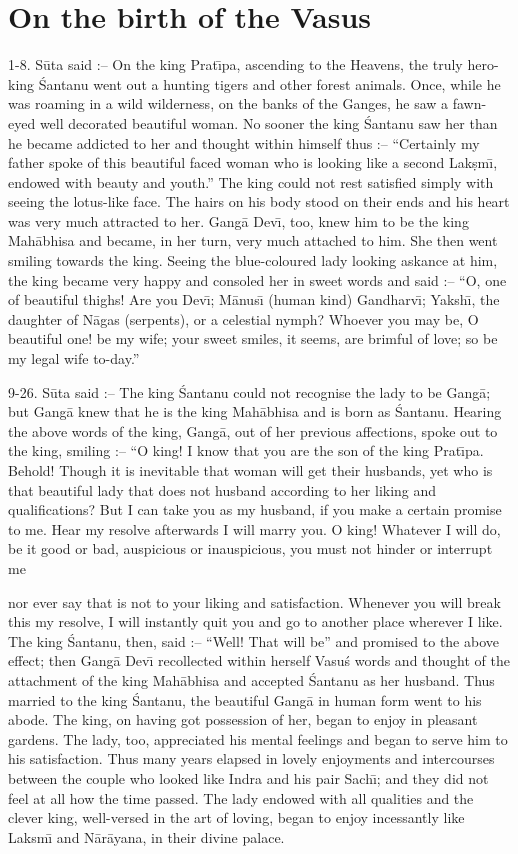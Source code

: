\chapter{On the birth of the Vasus}

1-8. S\=uta said :-- On the king Prat\={\i}pa, ascending to the Heavens, the truly hero-king \'Santanu went out a hunting tigers and other forest animals. Once, while he was roaming in a wild wilderness, on the banks of the Ganges, he saw a fawn-eyed well decorated beautiful woman. No sooner the king \'Santanu saw her than he became addicted to her and thought within himself thus :-- ``Certainly my father spoke of this beautiful faced woman who is looking like a second Lak\d{s}m\={\i}, endowed with beauty and youth.'' The king could not rest satisfied simply with seeing the lotus-like face. The hairs on his body stood on their ends and his heart was very much attracted to her. Gang\=a Dev\={\i}, too, knew him to be the king Mah\=abhisa and became, in her turn, very much attached to him. She then went smiling towards the king. Seeing the blue-coloured lady looking askance at him, the king became very happy and consoled her in sweet words and said :-- ``O, one of beautiful thighs! Are you Dev\={\i}; M\=anus\={\i} (human kind) Gandharv\={\i}; Yaksh\={\i}, the daughter of N\=agas (serpents), or a celestial nymph? Whoever you may be, O beautiful one! be my wife; your sweet smiles, it seems, are brimful of love; so be my legal wife to-day.''

9-26. S\=uta said :-- The king \'Santanu could not recognise the lady to be Gang\=a; but Gang\=a knew that he is the king Mah\=abhisa and is born as \'Santanu. Hearing the above words of the king, Gang\=a, out of her previous affections, spoke out to the king, smiling :-- ``O king! I know that you are the son of the king Prat\={\i}pa. Behold! Though it is inevitable that woman will get their husbands, yet who is that beautiful lady that does not husband according to her liking and qualifications? But I can take you as my husband, if you make a certain promise to me. Hear my resolve afterwards I will marry you. O king! Whatever I will do, be it good or bad, auspicious or inauspicious, you must not hinder or interrupt me

nor ever say that is not to your liking and satisfaction. Whenever you will break this my resolve, I will instantly quit you and go to another place wherever I like. The king \'Santanu, then, said :-- ``Well! That will be'' and promised to the above effect; then Gang\=a Dev\={\i} recollected within herself Vasu\'s words and thought of the attachment of the king Mah\=abhisa and accepted \'Santanu as her husband. Thus married to the king \'Santanu, the beautiful Gang\=a in human form went to his abode. The king, on having got possession of her, began to enjoy in pleasant gardens. The lady, too, appreciated his mental feelings and began to serve him to his satisfaction. Thus many years elapsed in lovely enjoyments and intercourses between the couple who looked like Indra and his pair Sach\={\i}; and they did not feel at all how the time passed. The lady endowed with all qualities and the clever king, well-versed in the art of loving, began to enjoy incessantly like Laksm\={\i} and N\=ar\=ayana, in their divine palace.

